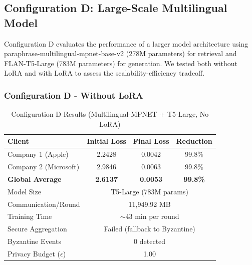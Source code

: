\documentclass[conference]{IEEEtran}
\begin{document}
\subsection{Configuration D: Large-Scale Multilingual Model}

Configuration D evaluates the performance of a larger model architecture using paraphrase-multilingual-mpnet-base-v2 (278M parameters) for retrieval and FLAN-T5-Large (783M parameters) for generation. We tested both without LoRA and with LoRA to assess the scalability-efficiency tradeoff.

\subsubsection{Configuration D - Without LoRA}

\begin{table}[h]
\centering
\caption{Configuration D Results (Multilingual-MPNET + T5-Large, No LoRA)}
\label{tab:config_d_no_lora}
\begin{tabular}{@{}lccc@{}}
\toprule
\textbf{Client} & \textbf{Initial Loss} & \textbf{Final Loss} & \textbf{Reduction} \\
\midrule
Company 1 (Apple) & 2.2428 & 0.0042 & 99.8\% \\
Company 2 (Microsoft) & 2.9846 & 0.0063 & 99.8\% \\
\midrule
\textbf{Global Average} & \textbf{2.6137} & \textbf{0.0053} & \textbf{99.8\%} \\
\midrule
Model Size & \multicolumn{3}{c}{T5-Large (783M params)} \\
Communication/Round & \multicolumn{3}{c}{11,949.92 MB} \\
Training Time & \multicolumn{3}{c}{$\sim$43 min per round} \\
Secure Aggregation & \multicolumn{3}{c}{Failed (fallback to Byzantine)} \\
Byzantine Events & \multicolumn{3}{c}{0 detected} \\
Privacy Budget ($\epsilon$) & \multicolumn{3}{c}{1.00} \\
\bottomrule
\end{tabular}
\end{table}
\end{document}
